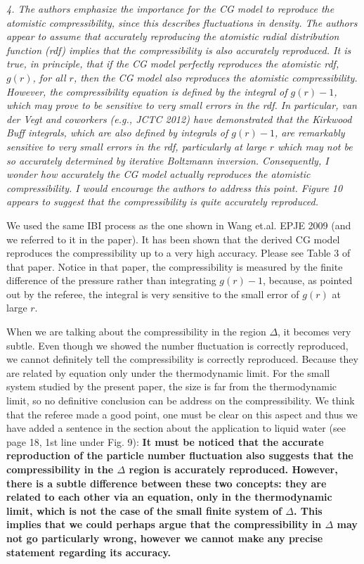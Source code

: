 \documentclass[a4paper]{article}
\begin{document}
\textit{
4. The authors emphasize the importance for the CG model to reproduce
the atomistic compressibility, since this describes fluctuations in
density. The authors appear to assume that accurately reproducing the
atomistic radial distribution function (rdf) implies that the
compressibility is also accurately reproduced. It is true, in
principle, that if the CG model perfectly reproduces the atomistic
rdf, $g(r)$, for all $r$, then the CG model also reproduces the atomistic
compressibility. However, the compressibility equation is defined by
the integral of $g(r)-1$, which may prove to be sensitive to very
small errors in the rdf. In particular, van der Vegt and coworkers
(e.g., JCTC 2012) have demonstrated that the Kirkwood Buff integrals,
which are also defined by integrals of $g(r)-1$, are remarkably
sensitive to very small errors in the rdf, particularly at large $r$
which may not be so accurately determined by iterative Boltzmann
inversion. Consequently, I wonder how accurately the CG model actually
reproduces the atomistic compressibility. I would encourage the
authors to address this point. Figure 10 appears to suggest that the
compressibility is quite accurately reproduced.
}

We used the same IBI process as the one shown in Wang et.al. EPJE
2009 (and we referred to it in the paper).  It has been shown that the derived CG model reproduces the
compressibility up to a very high accuracy. Please see Table 3 of that
paper.
Notice in that paper, the compressibility is measured by the
finite  difference of the pressure rather than integrating $g(r)-1$,
because, as pointed out by the referee, the integral is very sensitive
to the small error of $g(r)$ at large $r$.

When we are talking about the compressibility in the region $\Delta$,
it becomes very subtle. Even though we showed the number fluctuation
is correctly reproduced, we cannot definitely tell the compressibility
is correctly reproduced. Because they are related by equation only
under the thermodynamic limit.  For the small system studied by the
present paper, the size is far from the thermodynamic limit, so no
definitive conclusion can be address on the compressibility.
We think that the referee made a good point, one must be clear on this aspect and thus we have added a sentence in the section about the application to liquid water (see page 18, 1st line under Fig. 9): {\bf It must be noticed that the accurate reproduction of the particle number fluctuation also suggests that the compressibility in the $\Delta$ region is accurately reproduced. However, there is a subtle difference between these two concepts: they are related to each other via an equation, only in the thermodynamic limit, which is not the case of the small finite system of $\Delta$. This implies that we could perhaps argue that the compressibility in $\Delta$ may not go particularly wrong, however we cannot make any precise statement regarding its accuracy.}
\\
\end{document}
